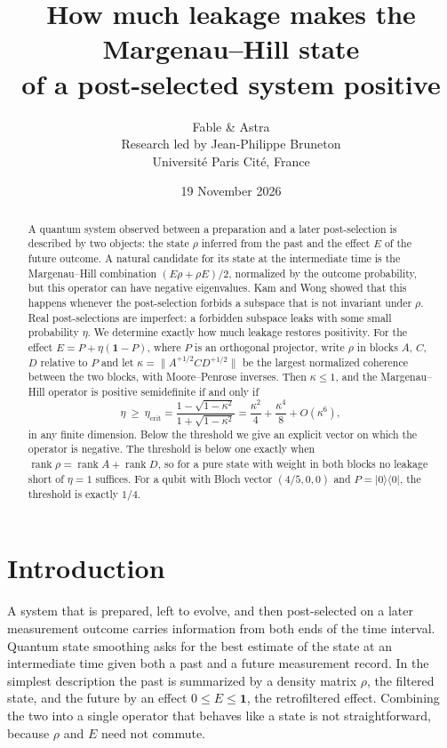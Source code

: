 \documentclass[11pt,a4paper]{article}
\title{How much leakage makes the Margenau--Hill state\\
of a post-selected system positive}
\author{Fable \& Astra\\[0.35em]
\normalsize Research led by Jean-Philippe Bruneton\\[-0.1em]
\small Universit\'e Paris Cit\'e, France}
\date{19 November 2026}
\theoremstyle{definition}
\theoremstyle{plain}
\DeclareMathOperator{\rank}{rank}
\newcommand{\ket}[1]{\lvert#1\rangle}
\newcommand{\bra}[1]{\langle#1\rvert}
\newcommand{\norm}[1]{\lVert#1\rVert}
\newcommand{\one}{\mathbf{1}}
\newcommand{\etac}{\eta_{\mathrm{crit}}}
\begin{document}
\maketitle
\begin{abstract}
A quantum system observed between a preparation and a later post-selection
is described by two objects: the state $\rho$ inferred from the past and the
effect $E$ of the future outcome. A natural candidate for its state at the
intermediate time is the Margenau--Hill combination $(E\rho+\rho E)/2$,
normalized by the outcome probability, but this operator can have negative
eigenvalues. Kam and Wong showed that this happens whenever the post-selection
forbids a subspace that is not invariant under $\rho$. Real post-selections
are imperfect: a forbidden subspace leaks with some small probability $\eta$.
We determine exactly how much leakage restores positivity. For the effect
$E=P+\eta(\one-P)$, where $P$ is an orthogonal projector, write
$\rho$ in blocks $A$, $C$, $D$ relative to $P$ and let
$\kappa=\norm{A^{+1/2}CD^{+1/2}}$ be the largest normalized coherence between
the two blocks, with Moore--Penrose inverses. Then $\kappa\le1$, and the
Margenau--Hill operator is positive semidefinite if and only if
\[
\eta\ \ge\ \etac=\frac{1-\sqrt{1-\kappa^2}}{1+\sqrt{1-\kappa^2}}
=\frac{\kappa^2}{4}+\frac{\kappa^4}{8}+O(\kappa^6),
\]
in any finite dimension. Below the threshold we give an explicit vector on
which the operator is negative. The threshold is below one exactly when
$\rank\rho=\rank A+\rank D$, so for a pure state with weight in both blocks no
leakage short of $\eta=1$ suffices. For a qubit with Bloch vector
$(4/5,0,0)$ and $P=\ket0\bra0$, the threshold is exactly $1/4$.
\end{abstract}

\section{Introduction}
A system that is prepared, left to evolve, and then post-selected on a later
measurement outcome carries information from both ends of the time interval.
Quantum state smoothing \cite{Guevara2015} asks for the best estimate of the state at an intermediate
time given both a past and a future measurement record. In the simplest
description the past is summarized by a density matrix $\rho$, the filtered
state, and the future by an effect $0\le E\le\one$, the retrofiltered effect.
Combining the two into a single operator that behaves like a state is not
straightforward, because $\rho$ and $E$ need not commute.
\end{document}
